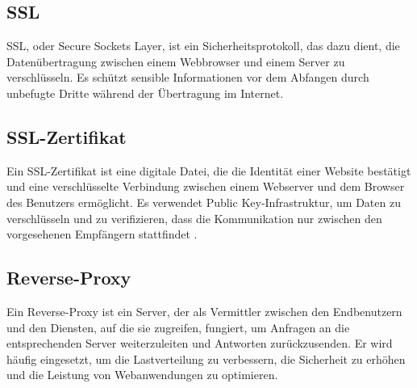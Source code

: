 \subsection{SSL}
\label{subsec:ssl}
SSL, oder Secure Sockets Layer, ist ein Sicherheitsprotokoll, das dazu dient, die Datenübertragung zwischen einem Webbrowser und einem Server zu verschlüsseln. Es schützt sensible Informationen vor dem Abfangen durch unbefugte Dritte während der Übertragung im Internet.

\subsection{SSL-Zertifikat}
\label{subsec:sslcertificate}
Ein SSL-Zertifikat ist eine digitale Datei, die die Identität einer Website bestätigt und eine verschlüsselte Verbindung zwischen einem Webserver und dem Browser des Benutzers ermöglicht. Es verwendet Public Key-Infrastruktur, um Daten zu verschlüsseln und zu verifizieren, dass die Kommunikation nur zwischen den vorgesehenen Empfängern stattfindet \cite {SSL}.

\subsection{Reverse-Proxy}
\label{subsec:reverseproxy}
Ein Reverse-Proxy ist ein Server, der als Vermittler zwischen den Endbenutzern und den Diensten, auf die sie zugreifen, fungiert, um Anfragen an die entsprechenden Server weiterzuleiten und Antworten zurückzusenden. Er wird häufig eingesetzt, um die Lastverteilung zu verbessern, die Sicherheit zu erhöhen und die Leistung von Webanwendungen zu optimieren\cite{Reverseproxy}.





